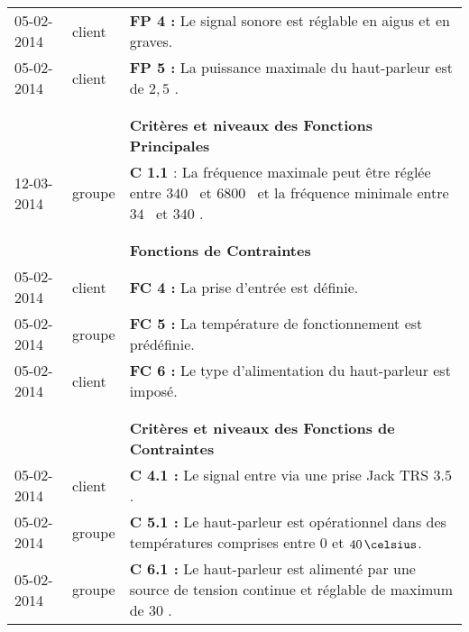 \begin{table}
\begin{changemargin}{-2cm}{2cm}
\begin{tabular}{|p{2cm}|p{1.5cm}|p{13cm}|}
		05-02-2014 & client & \textbf{FP 4 :} Le signal sonore est réglable en aigus et en graves.\\
	
		05-02-2014 & client & \textbf{FP 5 :} La puissance maximale du haut-parleur est de $2,5$ \watt.\\
	& &\\
\hline
	 & &\\
	 	& & \textbf{Critères et niveaux des Fonctions Principales} \\

	 	12-03-2014 & groupe & \textbf{C 1.1} : La fréquence maximale peut être réglée entre $340$ \hertz \, et $6800$ \hertz \, et la fréquence minimale entre $34$ \hertz \, et $340$ \hertz.\\
	 & &\\
\hline
	 & &\\
	 & & \textbf{ Fonctions de Contraintes}\\

		05-02-2014 & client & \textbf{FC 4 :} La prise d’entrée est définie.\\

		05-02-2014 & groupe & \textbf{FC 5 :} La température de fonctionnement est prédéfinie.\\
	
		05-02-2014 & client & \textbf{FC 6 :} Le type d’alimentation du haut-parleur est imposé.\\
	 & &\\
\hline
	& &\\
		& & \textbf{ Critères et niveaux des Fonctions de Contraintes}\\

	 	05-02-2014 & client & \textbf{C 4.1 :} Le signal entre via une prise Jack TRS $3.5$ \milli \meter.\\

		05-02-2014 & groupe & \textbf{C 5.1 :} Le haut-parleur est opérationnel dans des températures comprises entre $0$ et $40\,\celsius$.\\
	
		05-02-2014 & groupe & \textbf{C 6.1 :} Le haut-parleur est alimenté par une source de tension continue et réglable de maximum de $30$ \volt.\\
	
\hline
 \end{tabular}
 \end{changemargin}
  \end{table}
